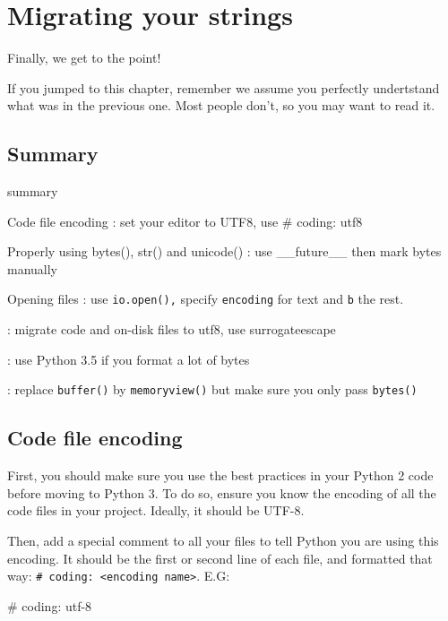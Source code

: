 
\chapter{Migrating your strings}

Finally, we get to the point!

If you jumped to this chapter, remember we assume you perfectly undertstand what was in the previous one. Most people don't, so you may want to read it.

\section{Summary}

\begin{labeling}{summary}
    \item [Code file encoding]: set your editor to UTF8, use # coding: utf8
    \item [Properly using bytes(), str() and unicode()]: use __future__ then mark bytes manually
    \item [Opening files]: use \lstinline{io.open(),} specify \lstinline{encoding} for text and \lstinline{b} the rest.
    \item [Fun with file paths]: migrate code and on-disk files to utf8, use surrogateescape
    \item [Formatting]: use Python 3.5 if you format a lot of bytes
    \item [from buffer() to memoryview()]: replace \lstinline{buffer()} by \lstinline{memoryview()} but make sure you only pass \lstinline{bytes()}
\end{labeling}

\section{Code file encoding}

First, you should make sure you use the best practices in your Python 2 code before moving to Python 3. To do so, ensure you know the encoding of all the code files in your project. Ideally, it should be UTF-8.

Then, add a special comment to all your files to tell Python you are using this encoding. It should be the first or second line of each file, and formatted that way: \lstinline{# coding: <encoding name>}. E.G:

\begin{py2and3}
# coding: utf-8
\end{py2and3}

